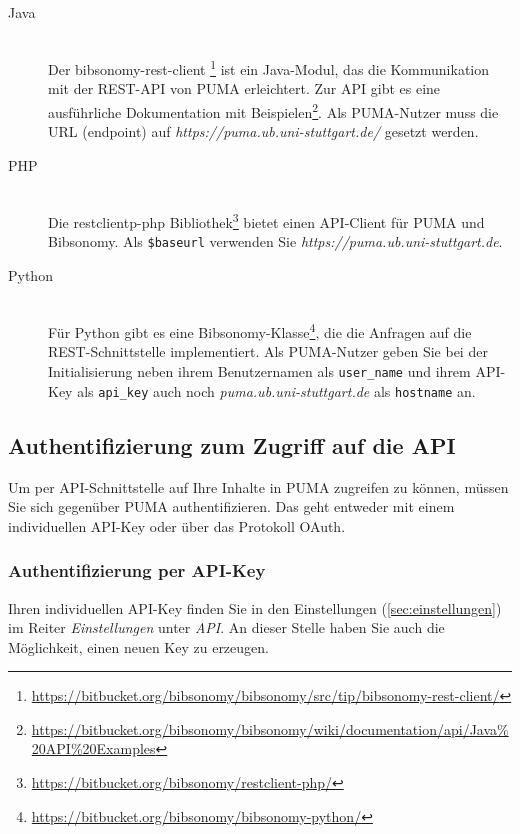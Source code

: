 \begin{description}
\item [Java] \hfill \\
  Der bibsonomy-rest-client \footnote{\url{https://bitbucket.org/bibsonomy/bibsonomy/src/tip/bibsonomy-rest-client/}} ist ein Java-Modul, das die Kommunikation mit der REST-API von PUMA erleichtert. Zur API gibt es eine ausführliche Dokumentation mit Beispielen\footnote{\url{https://bitbucket.org/bibsonomy/bibsonomy/wiki/documentation/api/Java\%20API\%20Examples}}. Als PUMA-Nutzer muss die URL (endpoint) auf \textit{https://puma.ub.uni-stuttgart.de/} gesetzt werden.
\item [PHP] \hfill \\
  Die restclientp-php Bibliothek\footnote{\url{https://bitbucket.org/bibsonomy/restclient-php/}} bietet einen API-Client für PUMA und Bibsonomy. Als \texttt{\$baseurl} verwenden Sie \textit{https://puma.ub.uni-stuttgart.de}.
\item [Python] \hfill \\
 Für Python gibt es eine Bibsonomy-Klasse\footnote{\url{https://bitbucket.org/bibsonomy/bibsonomy-python/}}, die die Anfragen auf die REST-Schnittstelle implementiert. Als PUMA-Nutzer geben Sie bei der Initialisierung neben ihrem Benutzernamen als \texttt{user\_name} und ihrem API-Key als \texttt{api\_key} auch noch \textit{puma.ub.uni-stuttgart.de} als \texttt{hostname} an.

\end{description}

\subsection{Authentifizierung zum Zugriff auf die API}
\label{subsec:apiAuth}

Um per API-Schnittstelle auf Ihre Inhalte in PUMA zugreifen zu können, müssen Sie sich gegenüber PUMA authentifizieren. Das geht entweder mit einem individuellen API-Key oder über das Protokoll OAuth.

\subsubsection*{Authentifizierung per API-Key}
\label{sss:apiKey}

Ihren individuellen API-Key finden Sie in den Einstellungen (\autoref{sec:einstellungen}) im Reiter \textit{Einstellungen} unter \textit{API}. An dieser Stelle haben Sie auch die Möglichkeit, einen neuen Key zu erzeugen. 


